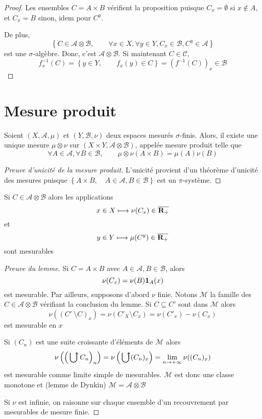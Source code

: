 \begin{proof}
Les ensembles $C=A\times B$ vérifient la proposition puisque  $C_x=\emptyset$ si  $x \not \in  A$, et $C_x=B$ sinon, idem pour  $C^y$.

De plus,  \[
\left\{ C \in  \mathcal  A\otimes \mathcal  B, \qquad  \forall x \in  X, \forall  y \in  Y, C_x \in  \mathcal  B, C^y \in  \mathcal  A \right\} 
\] 
est une $\sigma$-algèbre. Donc, c'est  $\mathcal  A\otimes \mathcal  B$. Si maintenant $C \in  \mathcal C$, \[
    f_x^{-1}(C)= \left\{ y \in  Y, \qquad  f_x(y)\in C \right\} = (f^{-1}(C))_x \in \mathcal  B
\] 
\end{proof}

\section{Mesure produit}

\begin{thm}
    Soient $(X, \mathcal  A, \mu)$ et $(Y, \mathcal  B, \nu)$ deux espaces mesurés $\sigma$-finis. Alors, il existe une unique mesure $\mu\otimes \nu$ sur $(X\times Y, \mathcal  A\otimes \mathcal  B)$, appelée mesure produit telle que \[
        \forall  A \in  \mathcal  A, \forall  B \in  \mathcal  B, \qquad  \mu\otimes \nu(A\times B)=\mu(A)\nu(B)
    \] 
\end{thm}

\begin{proof}[Preuve d'unicité de la mesure produit]
L'unicité provient d'un théorème d'unicité des mesures puisque $\left\{ A\times B, \quad  A \in  \mathcal  A, B \in  \mathcal  B \right\} $ est un $\pi$-système.
\end{proof}

\begin{lmm}
Si $C \in  \mathcal  A\otimes \mathcal  B$ alors les applications \[
    x \in  X \longmapsto \nu(C_x) \in  \overline{\mathbf R_+}
\] 
et \[
    y \in  Y \longmapsto \mu(C^y) \in  \overline{\mathbf R_+}
\] 
sont mesurables
\end{lmm}

\begin{proof}[Preuve du lemme]
Si $C =  A\times B$ avec $A \in  \mathcal  A, B \in  \mathcal  B$, alors \[
    \nu(C_x)=\nu(B)\bm{1}_A(x)
\] 
est mesurable. Par ailleurs, supposons d'abord $\nu$ finie. Notons  $\mathcal  M$ la famille des $C \in  \mathcal  A\otimes \mathcal  B$ vérifiant la conclusion du lemme. Si $C\subseteq C'$ sont dans  $\mathcal  M$ alors \[\nu((C'\ \setminus  C)_x)=\nu(C'_X\setminus  C_x)=\nu(C'_x)-\nu(C_x)\] est mesurable en $x$

Si  $(C_n)$ est une suite croissante d'éléments de  $\mathcal  M$ alors \[
    \nu \left( \left( \ubigcup C_n \right)_n \right)=\nu\left(\ubigcup(C_n)_x\right)=\lim_{n\to +\infty}\nu((C_n)_x)
\] 
est mesurable comme limite simple de mesurables. $\mathcal  M$ est donc une classe monotone et (lemme de Dynkin) $\mathcal  M=\mathcal  A\otimes \mathcal  B$

Si $\nu$ est infinie, on raisonne sur chaque ensemble d'un recouvrement par mesurables de mesure finie.
\end{proof}

